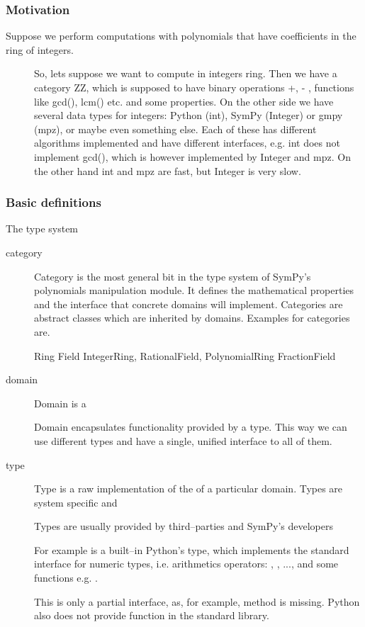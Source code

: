 \cite{Richardson1997zero}


\subsubsection{Motivation}
\begin{description}
\item[Suppose we perform computations with polynomials that have coefficients in the ring of integers.] \leavevmode
So, lets suppose we want to compute in integers ring. Then we have
a category ZZ, which is supposed to have binary operations +, -
, functions like gcd(), lcm() etc. and some properties. On the
other side we have several data types for integers: Python (int),
SymPy (Integer) or gmpy (mpz), or maybe even something else. Each
of these has different algorithms implemented and have different
interfaces, e.g. int does not implement gcd(), which is however
implemented by Integer and mpz. On the other hand int and mpz
are fast, but Integer is very slow.

\end{description}


\subsubsection{Basic definitions}

The type system
\begin{description}
\item[category] \leavevmode
Category is the most general bit in the type system of SymPy's polynomials manipulation
module. It defines the mathematical properties and the interface that concrete domains
will implement. Categories are abstract classes which are inherited by domains. Examples
for categories are.

Ring
Field
IntegerRing,
RationalField,
PolynomialRing
FractionField

\item[domain] \leavevmode
Domain is a

Domain encapsulates functionality provided by a type. This way we can use different
types and have a single, unified interface to all of them.

\item[type] \leavevmode
Type is a raw implementation of the of a particular domain. Types are system specific
and

Types are usually provided by third--parties and SymPy's developers

For example  is a built--in Python's type, which implements the standard interface
for numeric types, i.e. arithmetics operators: , , ..., and some
functions e.g. .

This is only a partial interface, as, for example,  method is missing. Python
also does not provide  function in the standard library.

\end{description}


